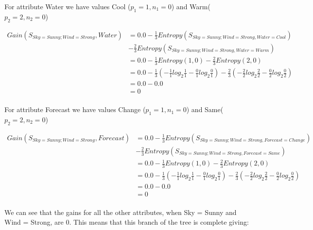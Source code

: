 \documentclass[10pt,a4paper]{article}
\begin{document}
{{{{{{{{{{For attribute Water we have values Cool ($p_1=1,n_1=0$) and Warm($p_2=2,n_2=0$)

\begin{equation}
\begin{split}
Gain(S_{Sky=Sunny;Wind=Strong},Water) &= 0.0 - \frac{1}{3} Entropy(S_{Sky=Sunny;Wind=Strong,Water=Cool} ) \\  &- \frac{2}{3}Entropy(S_{Sky=Sunny;Wind=Strong,Water=Warm}) \\
          &= 0.0 - \frac{1}{3} Entropy(1,0) - \frac{2}{3}Entropy(2,0) \\
          &= 0.0 -\frac{1}{3} ( -\frac{1}{1} log_2\frac{1}{1} -\frac{0}{1} log_2\frac{0}{1} ) - \frac{2}{3}(-\frac{2}{2} log_2\frac{2}{2} - \frac{0}{2}log_2\frac{0}{2} ) \\
          &= 0.0 - 0.0\\
          &= 0 \\
\end{split}
\end{equation}

For attribute Forecast we have values Change ($p_1=1,n_1=0$) and Same($p_2=2,n_2=0$)

\begin{equation}
\begin{split}
Gain(S_{Sky=Sunny;Wind=Strong},Forecast) &= 0.0 - \frac{1}{3} Entropy(S_{Sky=Sunny;Wind=Strong,Forecast=Change} ) \\  &- \frac{2}{3}Entropy(S_{Sky=Sunny;Wind=Strong,Forecast=Same}) \\
          &= 0.0 - \frac{1}{3} Entropy(1,0) - \frac{2}{3}Entropy(2,0) \\
          &= 0.0 -\frac{1}{3} ( -\frac{1}{1} log_2\frac{1}{1} -\frac{0}{1} log_2\frac{0}{1} ) - \frac{2}{3}(-\frac{2}{2} log_2\frac{2}{2} - \frac{0}{2}log_2\frac{0}{2} ) \\
          &= 0.0 - 0.0\\
          &= 0 \\
\end{split}
\end{equation}

We can see that the gains for all the other attributes, when Sky = Sunny and Wind = Strong, are 0. This means that this branch of the tree is complete giving:


}}}}}}}}}}
\end{document}
